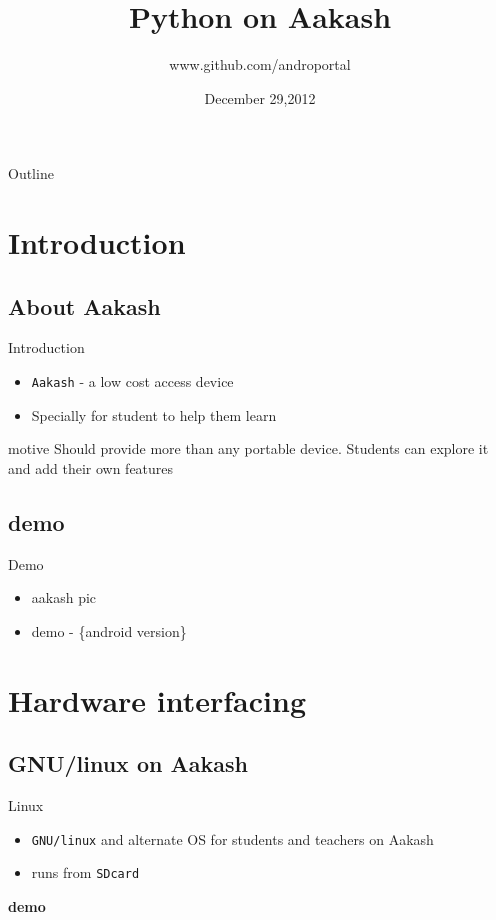 \documentclass{beamer}
\title[Python on Aakash]{Python on Aakash}
\author{www.github.com/androportal}
\institute{Indian Institute of Technology, Bombay}
\date{December 29,2012}
\begin{document}
\begin{frame}
  \titlepage
\end{frame}

\begin{frame}{Outline}
 \tableofcontents
\end{frame}

\section{Introduction}
\subsection{About Aakash}
\begin{frame}{Introduction}
\begin{itemize}
  \item {\tt Aakash} - a low cost access device
  \item Specially for student to help them learn
\end{itemize}
\vskip 1cm
\begin{block}{motive}
  Should provide more than any portable device. Students can explore
  it and add their own features 
\end{block}
\end{frame}

\subsection{demo}
\begin{frame}{Demo}
\begin{itemize}
  \item aakash pic
  \item demo - \{android version\}
\end{itemize}
\end{frame}

\section{Hardware interfacing}

\subsection{GNU/linux on Aakash}
\begin{frame}{Linux}
  \begin{block}{}
    \begin{itemize}
    \item {\tt GNU/linux} and alternate OS for students and teachers
      on Aakash
    \item runs from {\tt SDcard}
    \end{itemize}
  \end{block}
  \vskip 1cm
  \centerline {\bf demo}
\end{frame}
\end{document}

